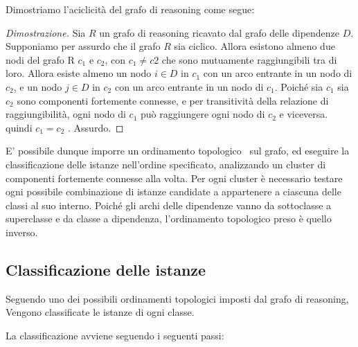 Dimostriamo l'aciclicità del grafo di reasoning come segue:

\begin{proof}[Dimostrazione]
Sia $R$ un grafo di reasoning ricavato dal grafo delle dipendenze $D$.
Supponiamo per assurdo che il grafo $R$ sia ciclico. Allora esistono almeno due nodi del grafo R $c_1$ e $c_2$, con $c_1\neq c2$ che sono mutuamente raggiungibili tra di loro. 
Allora esiste almeno un nodo $i\in D$ in $c_1$ con un arco entrante in un nodo di $c_2$, e un nodo $j\in D$ in $c_2$ con un arco entrante in un nodo di $c_1$. Poiché sia $c_1$ sia $c_2$ sono componenti fortemente connesse, e per transitività della relazione di raggiungibilità, ogni nodo di $c_1$ può raggiungere ogni nodo di $c_2$ e viceversa. quindi $c_1=c_2$ . Assurdo.
\end{proof}

E' possibile dunque imporre un ordinamento topologico~\cite{Kahn:1962:TSL:368996.369025} sul grafo, ed eseguire la classificazione delle istanze nell'ordine specificato, analizzando un cluster di componenti fortemente connesse alla volta. Per ogni cluster è necessario testare ogni possibile combinazione di istanze candidate a appartenere a ciascuna delle classi al suo interno. Poiché gli archi delle dipendenze vanno da sottoclasse a superclasse e da classe a dipendenza, l'ordinamento topologico preso è quello inverso.

\subsection{Classificazione delle istanze}

Seguendo uno dei possibili ordinamenti topologici imposti dal grafo di reasoning, Vengono classificate le istanze di ogni classe.

La classificazione avviene seguendo i seguenti passi:

